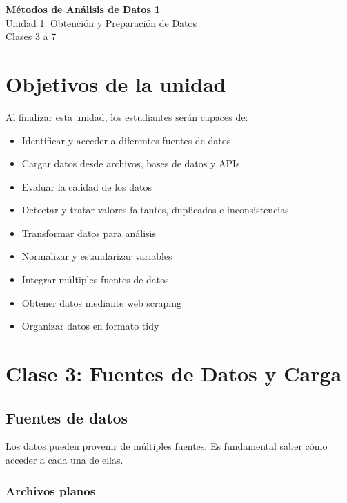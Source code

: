 \documentclass[a4paper,11pt]{article}
\begin{document}
\begin{center}
    {\Large \textbf{Métodos de Análisis de Datos 1}}\\[0.3em]
    {\large Unidad 1: Obtención y Preparación de Datos}\\[0.2em]
    {\normalsize Clases 3 a 7}
\end{center}

\vspace{1em}

\section*{Objetivos de la unidad}

Al finalizar esta unidad, los estudiantes serán capaces de:
\begin{itemize}[leftmargin=*]
    \item Identificar y acceder a diferentes fuentes de datos
    \item Cargar datos desde archivos, bases de datos y APIs
    \item Evaluar la calidad de los datos
    \item Detectar y tratar valores faltantes, duplicados e inconsistencias
    \item Transformar datos para análisis
    \item Normalizar y estandarizar variables
    \item Integrar múltiples fuentes de datos
    \item Obtener datos mediante web scraping
    \item Organizar datos en formato tidy
\end{itemize}

\section{Clase 3: Fuentes de Datos y Carga}

\subsection{Fuentes de datos}

Los datos pueden provenir de múltiples fuentes. Es fundamental saber cómo acceder a cada una de ellas.

\subsubsection{Archivos planos}
\end{document}

